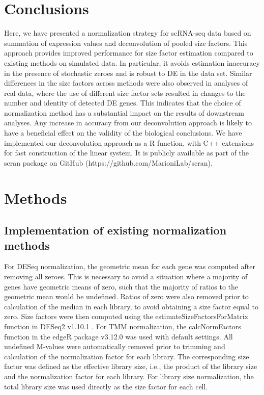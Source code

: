 \documentclass{bmcart}
\begin{document}
\section*{Conclusions}
Here, we have presented a normalization strategy for scRNA-seq data based on summation of expression values and deconvolution of pooled size factors.
This approach provides improved performance for size factor estimation compared to existing methods on simulated data.
In particular, it avoids estimation inaccuracy in the presence of stochastic zeroes and is robust to DE in the data set.
Similar differences in the size factors across methods were also observed in analyses of real data,
    where the use of different size factor sets resulted in changes to the number and identity of detected DE genes.
This indicates that the choice of normalization method has a substantial impact on the results of downstream analyses.
Any increase in accuracy from our deconvolution approach is likely to have a beneficial effect on the validity of the biological conclusions.
We have implemented our deconvolution approach as a R function, with C++ extensions for fast construction of the linear system.
It is publicly available as part of the scran package on GitHub ({https://github.com/MarioniLab/scran}).

\section*{Methods}

\subsection*{Implementation of existing normalization methods}
For DESeq normalization, the geometric mean for each gene was computed after removing all zeroes.
This is necessary to avoid a situation where a majority of genes have geometric means of zero, such that the majority of ratios to the geometric mean would be undefined.
Ratios of zero were also removed prior to calculation of the median in each library, to avoid obtaining a size factor equal to zero.
Size factors were then computed using the estimateSizeFactorsForMatrix function in DESeq2 v1.10.1 \cite{love2014moderated}.
For TMM normalization, the calcNormFactors function in the edgeR package v3.12.0 \cite{robinson2010edgeR} was used with default settings.
All undefined M-values were automatically removed prior to trimming and calculation of the normalization factor for each library.
The corresponding size factor was defined as the effective library size, i.e., the product of the library size and the normalization factor for each library.
For library size normalization, the total library size was used directly as the size factor for each cell.
\end{document}
